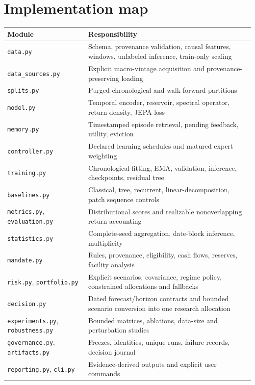 \documentclass[11pt,a4paper]{article}
\begin{document}
\appendix
\section{Implementation map}
\begin{longtable}{>{\raggedright\arraybackslash}p{.32\linewidth}>{\raggedright\arraybackslash}p{.59\linewidth}}
\toprule Module & Responsibility \\
\midrule\endhead
\texttt{data.py} & Schema, provenance validation, causal features, windows, unlabeled inference, train-only scaling \\
\texttt{data\_sources.py} & Explicit macro-vintage acquisition and provenance-preserving loading \\
\texttt{splits.py} & Purged chronological and walk-forward partitions \\
\texttt{model.py} & Temporal encoder, reservoir, spectral operator, return density, JEPA loss \\
\texttt{memory.py} & Timestamped episode retrieval, pending feedback, utility, eviction \\
\texttt{controller.py} & Declared learning schedules and matured expert weighting \\
\texttt{training.py} & Chronological fitting, EMA, validation, inference, checkpoints, residual tree \\
\texttt{baselines.py} & Classical, tree, recurrent, linear-decomposition, patch sequence controls \\
\texttt{metrics.py}, \texttt{evaluation.py} & Distributional scores and realizable nonoverlapping return accounting \\
\texttt{statistics.py} & Complete-seed aggregation, date-block inference, multiplicity \\
\texttt{mandate.py} & Rules, provenance, eligibility, cash flows, reserves, facility analysis \\
\texttt{risk.py}, \texttt{portfolio.py} & Explicit scenarios, covariance, regime policy, constrained allocations and fallbacks \\
\texttt{decision.py} & Dated forecast/horizon contracts and bounded scenario conversion into one research allocation \\
\texttt{experiments.py}, \texttt{robustness.py} & Bounded matrices, ablations, data-size and perturbation studies \\
\texttt{governance.py}, \texttt{artifacts.py} & Freezes, identities, unique runs, failure records, decision journal \\
\texttt{reporting.py}, \texttt{cli.py} & Evidence-derived outputs and explicit user commands \\
\bottomrule
\end{longtable}
\end{document}
